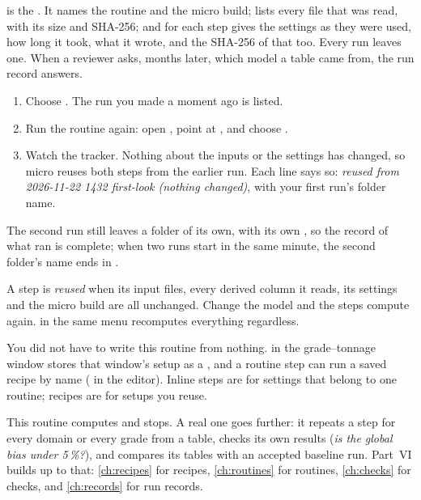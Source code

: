  is the . It names the routine and the micro build; lists every file that was read, with its size and SHA-256; and for each step gives the settings as they were used, how long it took, what it wrote, and the SHA-256 of that too. Every run leaves one. When a reviewer asks, months later, which model a table came from, the run record answers.

\begin{tryit}
\begin{enumerate}
\item Choose . The run you made a moment ago is listed.
\item Run the routine again: open , point at , and choose .
\item Watch the tracker. Nothing about the inputs or the settings has changed, so micro reuses both steps from the earlier run. Each line says so: \emph{reused from 2026-11-22 1432 first-look (nothing changed)}, with your first run's folder name.
\end{enumerate}
\end{tryit}

The second run still leaves a folder of its own, with its own , so the record of what ran is complete; when two runs start in the same minute, the second folder's name ends in .

A step is \emph{reused} when its input files, every derived column it reads, its settings and the micro build are all unchanged. Change the model and the steps compute again.  in the same menu recomputes everything regardless.

\begin{note}
You did not have to write this routine from nothing.  in the grade–tonnage window stores that window's setup as a , and a routine step can run a saved recipe by name ( in the editor). Inline steps are for settings that belong to one routine; recipes are for setups you reuse.
\end{note}

This routine computes and stops. A real one goes further: it repeats a step for every domain or every grade from a table, checks its own results (\emph{is the global bias under 5\,\%?}), and compares its tables with an accepted baseline run. Part~VI builds up to that: \cref{ch:recipes} for recipes, \cref{ch:routines} for routines, \cref{ch:checks} for checks, and \cref{ch:records} for run records.


